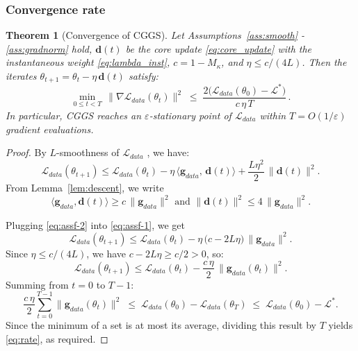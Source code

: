 \documentclass[11pt]{article}
\newtheorem{thm}{Theorem}[section]
\begin{document}
\subsubsection{Convergence rate}

\begin{thm}[Convergence of CGGS]\label{thm:main}
Let Assumptions~\ref{ass:smooth} - \ref{ass:gradnorm} hold, $\mathbf{d}(t)$ be the core update \eqref{eq:core_update} with the instantaneous weight \eqref{eq:lambda_inst}, $c = 1 - M_\kappa$, and $\eta \leq c/(4L)$. Then the iterates $\theta_{t+1} = \theta_t - \eta\, \mathbf{d}(t)$ satisfy:
\begin{equation}\label{eq:rate}
\min_{0 \leq t < T}\, \bigl\|\nabla\mathcal{L}_{data}(\theta_t)\bigr\|^{2} \;\leq\; \frac{2\bigl(\mathcal{L}_{data}(\theta_0) - \mathcal{L}^{*}\bigr)}{c\,\eta\, T}\,.
\end{equation}
In particular, CGGS reaches an $\varepsilon$-stationary point of $\mathcal{L}_{data}$ within $T = O(1/\varepsilon)$ gradient evaluations.
\end{thm}

\begin{proof}
By $L$-smoothness of $\mathcal{L}_{data}$ \cite{nesterov2013introductory}, we have:
\begin{equation}\label{eq:assf-1}
   \mathcal{L}_{data}(\theta_{t+1}) \leq \mathcal{L}_{data}(\theta_t) - \eta\,\langle \mathbf{g}_{data},\, \mathbf{d}(t)\rangle + \frac{L\eta^{2}}{2}\,\|\mathbf{d}(t)\|^{2}. 
\end{equation}
From Lemma~\ref{lem:descent}, we write
\begin{equation}\label{eq:assf-2}
    \langle \mathbf{g}_{data}, \mathbf{d}(t)\rangle \geq c\,\|\mathbf{g}_{data}\|^{2} \mbox{ and } \|\mathbf{d}(t)\|^{2} \leq 4\,\|\mathbf{g}_{data}\|^{2}. 
\end{equation}


Plugging \eqref{eq:assf-2} into \eqref{eq:assf-1}, we get
\[
\mathcal{L}_{data}(\theta_{t+1}) \leq \mathcal{L}_{data}(\theta_t) - \eta\,\bigl(c - 2L\eta\bigr)\, \|\mathbf{g}_{data}\|^{2}.
\]
Since $\eta \leq c/(4L)$, we have $c - 2L\eta \geq c/2 > 0$, so:
\[
\mathcal{L}_{data}(\theta_{t+1}) \leq \mathcal{L}_{data}(\theta_t) - \frac{c\,\eta}{2}\, \|\mathbf{g}_{data}(\theta_t)\|^{2}.
\]
Summing from $t = 0$ to $T-1$:
\[
\frac{c\,\eta}{2} \sum_{t=0}^{T-1} \|\mathbf{g}_{data}(\theta_t)\|^{2} \;\leq\; \mathcal{L}_{data}(\theta_0) - \mathcal{L}_{data}(\theta_T) \;\leq\; \mathcal{L}_{data}(\theta_0) - \mathcal{L}^{*}.
\]
Since the minimum of a set is at most its average, dividing this result by $T$ yields \eqref{eq:rate}, as required.
\end{proof}
\end{document}
